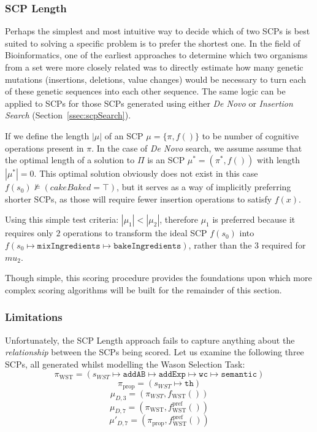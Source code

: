\subsubsection{SCP Length}
Perhaps the simplest and most intuitive way to decide which of two SCPs is best suited to solving a specific problem is to prefer the shortest one. In the field of Bioinformatics, one of the earliest approaches to determine which two organisms from a set were more closely related was to directly estimate how many genetic mutations (insertions, deletions, value changes) would be necessary to turn each of these genetic sequences into each other sequence. The same logic can be applied to SCPs for those SCPs generated using either \textit{De Novo} or \textit{Insertion Search} (Section~\ref{ssec:scpSearch}).

If we define the length $|\mu|$ of an SCP $\mu=\{\pi,f()\}$ to be number of cognitive operations present in $\pi$. In the case of \textit{De Novo} search, we assume assume that the optimal length of a solution to $\Pi$ is an SCP $\mu^*=(\pi^*,f())$ with length $|\mu^*|=0$. This optimal solution obviously does not exist in this case $f(s_0) \not\models (cakeBaked = \top)$, but it serves as a way of implicitly preferring shorter SCPs, as those will require fewer insertion operations to satisfy $f(x)$. 

Using this simple test criteria: $|\mu_1| < |\mu_2|$, therefore $\mu_1$ is preferred because it requires only $2$ operations to transform the ideal SCP $f(s_0)$ into $f(s_0\longmapsto \texttt{mixIngredients} \longmapsto \texttt{bakeIngredients})$, rather than the $3$ required for $mu_2$.

Though simple, this scoring procedure provides the foundations upon which more complex scoring algorithms will be built for the remainder of this section.

\subsubsection*{Limitations}

Unfortunately, the SCP Length approach fails to capture anything about the \textit{relationship} between the SCPs being scored. Let us examine the following three SCPs, all generated whilst modelling the Wason Selection Task:
\[
\pi_\text{WST}=(s_{WST} \longmapsto \texttt{addAB} \longmapsto \texttt{addExp} \longmapsto \texttt{wc} \longmapsto \texttt{semantic})
\]
\[
\pi_\text{prop}=(s_{WST} \longmapsto \texttt{th})
\]
\[
\mu_{D,3}=(\pi_{WST},f_\text{WST}())
\]
\[
\mu_{D,7}=(\pi_\text{WST},f_\text{WST}^\text{pref}())
\]
\[
\mu'_{D,7}=(\pi_\text{prop},f_\text{WST}^\text{pref}())
\]


